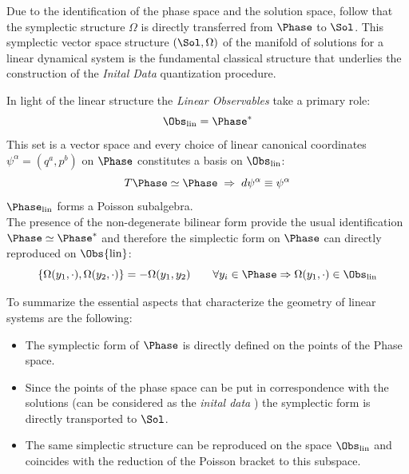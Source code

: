 \documentclass[Main]{subfiles}
\begin{document}
	Due to the identification of the phase space and the solution space, follow that the symplectic structure $\Omega$ is directly transferred from $\Phase$ to $\Sol$. This symplectic vector space structure $( \Sol	, \Omega)$ of the manifold of solutions for a linear dynamical system is the fundamental classical structure that underlies the construction of the \emph{Inital Data} quantization procedure.
	
	In light of the linear structure the \emph{Linear Observables} take a primary role:
	\begin{displaymath}
		\Obs_{\textrm{lin}} = \Phase^*
	\end{displaymath}
	This set is a vector space and every choice of linear canonical coordinates $\psi^\alpha = (q^a, p^b)$ on $\Phase$ constitutes a  basis on $\Obs_{\textrm{lin}} $:
	\begin{displaymath}
		T\Phase \simeq \Phase \; \Rightarrow \; d\psi^\alpha \equiv \psi^\alpha
	\end{displaymath}
	$\Phase_{\textrm{lin}}$ forms a Poisson subalgebra.
	\\%
	The presence of the non-degenerate bilinear form provide the usual identification $\Phase \simeq \Phase^*$ and therefore the simplectic form on $\Phase$ can directly reproduced on $\Obs{\textrm{lin}} $:
	\begin{displaymath}
		\{ \Omega(y_1, \cdot),\Omega(y_2, \cdot)\} = - \Omega(y_1, y_2) \qquad \forall y_i \in \Phase \Rightarrow \Omega(y_1, \cdot) \in \Obs_\textrm{lin}
	\end{displaymath}

	
	
	
	\begin{TAM}
			To summarize the essential aspects that characterize the geometry of linear systems are the following:
		\begin{itemize}
			\item The symplectic form of $\Phase$ is directly defined on the points of the Phase space.
			\item Since the points of the phase space can be put in correspondence with the solutions (can be considered as the \emph{inital data} ) the symplectic form is directly transported to $\Sol$.
			\item The same simplectic structure can be reproduced on the space $\Obs_\textrm{lin}$ and coincides with the reduction of the Poisson bracket to this subspace.
			\end{itemize}
	\end{TAM}
\end{document}
